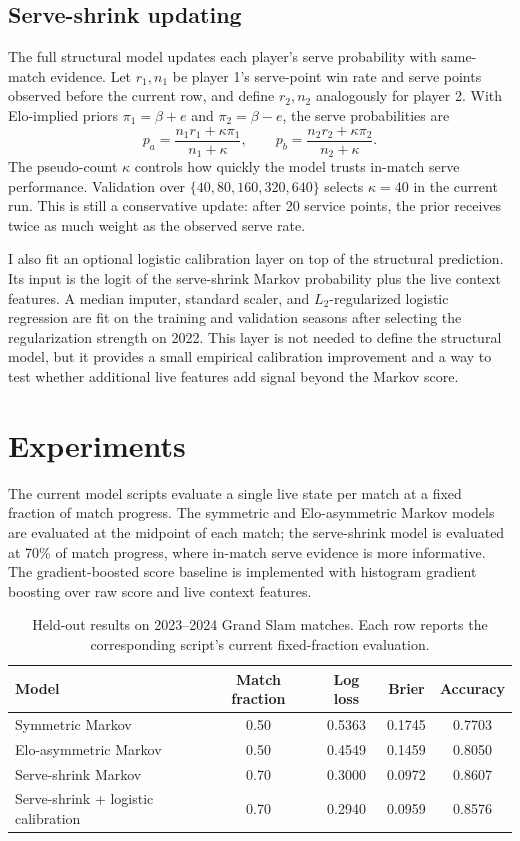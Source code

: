 \documentclass{article} %
\begin{document}
\subsection{Serve-shrink updating}

The full structural model updates each player's serve probability with
same-match evidence. Let $r_1,n_1$ be player 1's serve-point win rate and serve
points observed before the current row, and define $r_2,n_2$ analogously for
player 2. With Elo-implied priors $\pi_1=\beta+e$ and $\pi_2=\beta-e$, the
serve probabilities are
\[
    p_a = \frac{n_1 r_1 + \kappa \pi_1}{n_1+\kappa},
    \qquad
    p_b = \frac{n_2 r_2 + \kappa \pi_2}{n_2+\kappa}.
\]
The pseudo-count $\kappa$ controls how quickly the model trusts in-match serve
performance. Validation over $\{40,80,160,320,640\}$ selects $\kappa=40$ in the
current run. This is still a conservative update: after 20 service points, the
prior receives twice as much weight as the observed serve rate.

I also fit an optional logistic calibration layer on top of the structural
prediction. Its input is the logit of the serve-shrink Markov probability plus
the live context features. A median imputer, standard scaler, and
$L_2$-regularized logistic regression are fit on the training and validation
seasons after selecting the regularization strength on 2022. This layer is not
needed to define the structural model, but it provides a small empirical
calibration improvement and a way to test whether additional live features add
signal beyond the Markov score.

\section{Experiments}

The current model scripts evaluate a single live state per match at a fixed
fraction of match progress. The symmetric and Elo-asymmetric Markov models are
evaluated at the midpoint of each match; the serve-shrink model is evaluated at
70\% of match progress, where in-match serve evidence is more informative. The
gradient-boosted score baseline is implemented with histogram gradient
boosting over raw score and live context features.

\begin{table}[t]
\caption{Held-out results on 2023--2024 Grand Slam matches. Each row reports
the corresponding script's current fixed-fraction evaluation.}
\label{tab:results}
\begin{center}
\begin{tabular}{lcccc}
\toprule
Model & Match fraction & Log loss & Brier & Accuracy \\
\midrule
Symmetric Markov & 0.50 & 0.5363 & 0.1745 & 0.7703 \\
Elo-asymmetric Markov & 0.50 & 0.4549 & 0.1459 & 0.8050 \\
Serve-shrink Markov & 0.70 & 0.3000 & 0.0972 & 0.8607 \\
Serve-shrink + logistic calibration & 0.70 & 0.2940 & 0.0959 & 0.8576 \\
\bottomrule
\end{tabular}
\end{center}
\end{table}
\end{document}
